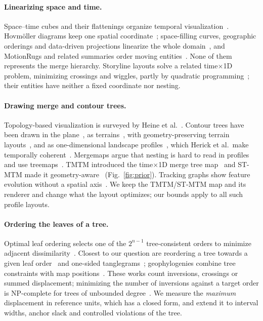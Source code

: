 \documentclass[review]{vgtc}                 %
\begin{document}
\paragraph{Linearizing space and time.}
Space--time cubes and their flattenings organize temporal visualization~\cite{Bach:2017:STC}. Hovm\"oller diagrams keep one spatial coordinate~\cite{Hovmoller:1949}; space-filling curves, geographic orderings and data-driven projections linearize the whole domain~\cite{Dafner:2000:CSFC,Guo:2006:SpatialOrder,Zhou:2021:DSF,Franke:2021:1DP,Weissenboeck:2019:DVL}, and MotionRugs and related summaries order moving entities~\cite{Buchmueller:2019:MR,Wulms:2021:SVS,Valdrighi:2024:MRV,Stolk:2025:GR}. None of them represents the merge hierarchy. Storyline layouts solve a related time$\times$1D problem, minimizing crossings and wiggles, partly by quadratic programming~\cite{Tanahashi:2012:Storyline,Liu:2013:SF,Dobler:2025:Wiggle}; their entities have neither a fixed coordinate nor nesting.

\paragraph{Drawing merge and contour trees.}
Topology-based visualization is surveyed by Heine et al.~\cite{Heine:2016:Survey}. Contour trees have been drawn in the plane~\cite{Heine:2011:DCT}, as terrains~\cite{Weber:2007:TL}, with geometry-preserving terrain layouts~\cite{Beketayev:2012:GPTL}, and as one-dimensional landscape profiles~\cite{Oesterling:2013:TLP}, which Herick et al.\ make temporally coherent~\cite{Herick:2020:TCTL}. Mergemaps argue that nesting is hard to read in profiles and use treemaps~\cite{Kamakshidasan:2021:MM}. TMTM introduced the time$\times$1D merge tree map~\cite{Koepp:2023:TMTM} and ST-MTM made it geometry-aware~\cite{STMTM:2026} (Fig.~\ref{fig:prior}). Tracking graphs show feature evolution without a spatial axis~\cite{Widanagamaachchi:2012:DTG,Lukasczyk:2017:NTG,Lukasczyk:2020:DNTG,Koepp:2019:TT,Oesterling:2017:TVMT}. We keep the TMTM/ST-MTM map and its renderer and change what the layout optimizes; our bounds apply to all such profile layouts.

\paragraph{Ordering the leaves of a tree.}
Optimal leaf ordering selects one of the $2^{n-1}$ tree-consistent orders to minimize adjacent dissimilarity~\cite{BarJoseph:2001:OLO,Eisen:1998:CA}. Closest to our question are reordering a tree towards a given leaf order~\cite{Bulteau:2022:RT} and one-sided tanglegrams~\cite{Fernau:2010:CTC,Dobler:2026:BCT,Huson:2026:DOT}; geophylogenies combine tree constraints with map positions~\cite{Klawitter:2025:GP}. These works count inversions, crossings or summed displacement; minimizing the number of inversions against a target order is NP-complete for trees of unbounded degree~\cite{Bulteau:2022:RT}. We measure the \emph{maximum} displacement in reference units, which has a closed form, and extend it to interval widths, anchor slack and controlled violations of the tree.
\end{document}
